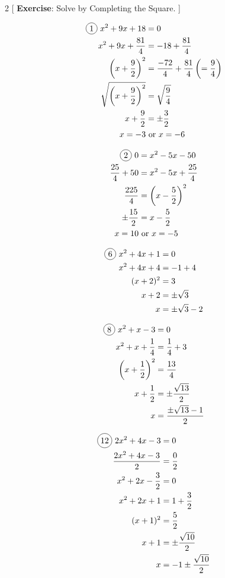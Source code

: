 \begin{multicols}{2}
[
  \textbf{Exercise}: Solve by Completing the Square.
]

\begin{align*}
  \circled{1}\ x^{2}+9x+18&=0\\
  x^{2}+9x+\frac{81}{4}&=-18+\frac{81}{4}\\
  \left( x+\frac{9}{2} \right)^{2}&=\frac{-72}{4}+\frac{81}{4}\left(=\frac{9}{4}\right)\\
  \sqrt{\left( x+\frac{9}{2} \right)^{2}}&=\sqrt{\frac{9}{4}}\\
  x+\frac{9}{2}&=\pm \frac{3}{2}\\
  x=-3 &\text{ or }x=-6
\end{align*}

\begin{align*}
  \circled{2}\ 0&=x^{2}-5x-50\\
  \frac{25}{4}+50&=x^{2}-5x+\frac{25}{4}\\
  \frac{225}{4}&=\left( x-\frac{5}{2} \right)^{2}\\
  \pm \frac{15}{2}&=x-\frac{5}{2}\\
  x=10 &\text{ or }x=-5
\end{align*}

\begin{align*}
  \circled{6}\ x^{2}+4x+1&=0\\
  x^{2}+4x+4&=-1+4\\
  (x+2)^{2}&=3\\
  x+2&=\pm\sqrt{3}\\
  x&=\pm\sqrt{3}-2
\end{align*}

\begin{align*}
  \circled{8}\ x^{2}+x-3&=0\\
  x^{2}+x+\frac{1}{4}&=\frac{1}{4}+3\\
  \left(x+\frac{1}{2}\right)^{2}&=\frac{13}{4}\\
  x+\frac{1}{2}&=\pm \frac{\sqrt{13}}{2}\\
  x&=\frac{\pm \sqrt{13}-1}{2}
\end{align*}

\begin{align*}
  \circled{12}\ 2x^{2}+4x-3&=0\\
  \frac{2x^{2}+4x-3}{2}&=\frac{0}{2}\\
  x^{2}+2x-\frac{3}{2}&=0\\
  x^{2}+2x+1&=1+\frac{3}{2}\\
  (x+1)^{2}&=\frac{5}{2}\\
  x+1&=\pm\frac{\sqrt{10}}{2}\\
  x&=-1\pm \frac{\sqrt{10}}{2}
\end{align*}


\end{multicols}
